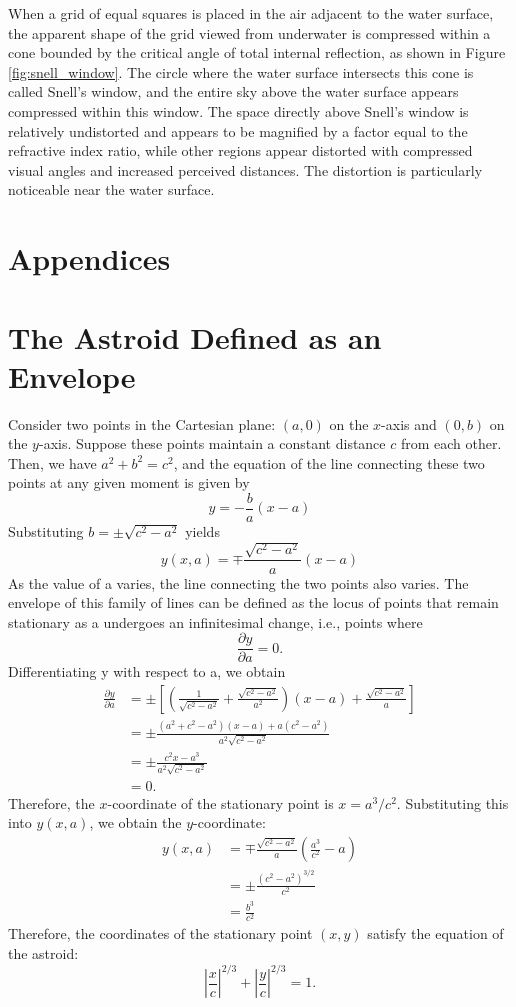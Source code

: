 \documentclass[twocolumn]{article}
\begin{document}
When a grid of equal squares is placed in the air adjacent to the water surface, the apparent shape of the grid viewed from underwater is compressed within a cone bounded by the critical angle of total internal reflection, as shown in Figure \ref{fig:snell_window}. The circle where the water surface intersects this cone is called Snell's window, and the entire sky above the water surface appears compressed within this window. The space directly above Snell's window is relatively undistorted and appears to be magnified by a factor equal to the refractive index ratio, while other regions appear distorted with compressed visual angles and increased perceived distances. The distortion is particularly noticeable near the water surface.



\appendix
\section*{Appendices}
\section{The Astroid Defined as an Envelope} \label{app:astroid}
Consider two points in the Cartesian plane: $(a, 0)$ on the $x$-axis and $(0, b)$ on the $y$-axis. Suppose these points maintain a constant distance $c$ from each other. Then, we have $a^2 + b^2 = c^2$, and the equation of the line connecting these two points at any given moment is given by
$$y = -\frac{b}{a}(x-a)$$
Substituting $b = \pm \sqrt{c^2 - a^2}$ yields
$$y(x, a) = \mp \frac{\sqrt{c^2 - a^2}}{a}(x-a)$$
As the value of a varies, the line connecting the two points also varies. The envelope of this family of lines can be defined as the locus of points that remain stationary as a undergoes an infinitesimal change, i.e., points where
$$\frac{\partial y}{\partial a} = 0.$$
Differentiating y with respect to a, we obtain
$$
\begin{aligned}
	\frac{\partial y}{\partial a} &= \pm\left[\left( \frac{1}{\sqrt{c^2-a^2}}+\frac{\sqrt{c^2-a^2}}{a^2}\right) (x-a) + \frac{\sqrt{c^2-a^2}}{a} \right]\\
	&= \pm \frac{(a^2+c^2-a^2)(x-a)+a(c^2-a^2)}{a^2\sqrt{c^2-a^2}}\\
	&= \pm \frac{c^2 x - a^3}{a^2 \sqrt{c^2 - a^2}}\\
	&= 0.
\end{aligned}
$$
Therefore, the $x$-coordinate of the stationary point is $x = a^3/c^2$. Substituting this into $y(x, a)$, we obtain the $y$-coordinate:
$$
\begin{aligned}
	y(x, a) &= \mp \frac{\sqrt{c^2-a^2}}{a}\left(\frac{a^3}{c^2}-a\right)\\
	& = \pm \frac{\left( c^2- a^2 \right)^{3/2}}{c^2}\\
	& = \frac{b^3}{c^2}
\end{aligned}
$$
Therefore, the coordinates of the stationary point $(x, y)$ satisfy the equation of the astroid:
$$ \left|\dfrac{x}{c}\right|^{2/3} + \left|\dfrac{y}{c}\right|^{2/3} = 1. $$
\end{document}
